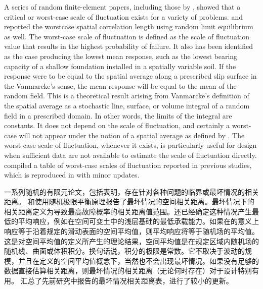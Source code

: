 \begin{ParaColumn}
    A series of random finite-element papers, including those by \citet{Fenton200354,Jaksa2005109,Fenton2007165,Breysse2007117,Ching2017a,Luo201645,Zhu201885}, showed that a critical or worst-case scale of fluctuation exists for a variety of problems. \citet{Javankhoshdel2017231} and \citet{ShahMalekpoor20201979} reported the worstcase spatial correlation length using random limit equilibrium as well. The worst-case scale of fluctuation is defined as the scale of fluctuation value that results in the highest probability of failure. It also has been identified as the case producing the lowest mean response, such as the lowest bearing capacity of a shallow foundation installed in a spatially variable soil. If the response were to be equal to the spatial average along a prescribed slip surface in the Vanmarcke’s \citeyearpar{Vanmarcke19771227} sense, the mean response will be equal to the mean of the random field. This is a theoretical result arising from Vanmarcke’s \citeyearpar{Vanmarcke19771227} definition of the spatial average as a stochastic line, surface, or volume integral of a random field in a prescribed domain. In other words, the limits of the integral are constants. It does not depend on the scale of fluctuation, and certainly a worst-case will not appear under the notion of a spatial average as defined by \citet{Vanmarcke19771227,Vanmarcke1983}. The worst-case scale of fluctuation, whenever it exists, is particularly useful for design when sufficient data are not available to estimate the scale of fluctuation directly. \citet{Ching2017a} compiled a table of worst-case scales of fluctuation reported in previous studies, which is reproduced in  with minor updates.

    \switchcolumn

    一系列随机的有限元论文，包括\citet{Fenton200354,Jaksa2005109,Fenton2007165,Breysse2007117,Ching2017a,Luo201645,Zhu201885}表明，存在针对各种问题的临界或最坏情况的相关距离。 \citet{Javankhoshdel2017231}和\citet{ShahMalekpoor20201979}使用随机极限平衡原理报告了最坏情况的空间相关距离。最坏情况下的相关距离定义为导致最高故障概率的相关距离值范围。还已经确定这种情况产生最低的平均响应，例如在空间可变土中的浅层基础的最低承载能力。如果在\citet{Vanmarcke19771227}的意义上响应等于沿着规定的滑动表面的空间平均值，则平均响应将等于随机场的平均值。这是\citet{Vanmarcke19771227}对空间平均值的定义所产生的理论结果，空间平均值是在规定区域内随机场的随机线、曲面或体积积分。换句话说，积分的极限是常数。它不取决于波动的规模，并且在\citet{Vanmarcke19771227,Vanmarcke1983}定义的空间平均值概念下，当然也不会出现最坏情况。如果没有足够的数据直接估算相关距离，则最坏情况的相关距离（无论何时存在）对于设计特别有用。 \citet{Ching2017a}汇总了先前研究中报告的最坏情况相关距离表，进行了较小的更新。


\end{ParaColumn}
